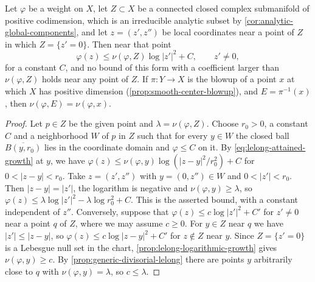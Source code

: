 \begin{proposition}\label{prop:generic-lelong-uniform-growth}
Let $\varphi$ be a weight on $X$, let $Z\subset X$ be a connected closed complex submanifold of positive codimension, which is an irreducible analytic subset by \cref{cor:analytic-global-components}, and let $z=(z',z'')$ be local coordinates near a point of $Z$ in which $Z=\{z'=0\}$. Then near that point
\[
 \varphi(z)\leq\nu(\varphi,Z)\log|z'|^2+C,\qquad z'\neq0,
\]
for a constant $C$, and no bound of this form with a coefficient larger than $\nu(\varphi,Z)$ holds near any point of $Z$. If $\pi\colon Y\to X$ is the blowup of a point $x$ at which $X$ has positive dimension (\cref{prop:smooth-center-blowup}), and $E=\pi^{-1}(x)$, then $\nu(\varphi,E)=\nu(\varphi,x)$.
\end{proposition}
\begin{proof}
Let $p\in Z$ be the given point and $\lambda=\nu(\varphi,Z)$. Choose $r_0>0$, a constant $C$ and a neighborhood $W$ of $p$ in $Z$ such that for every $y\in W$ the closed ball $\overline{B(y,r_0)}$ lies in the coordinate domain and $\varphi\leq C$ on it. By \eqref{eq:lelong-attained-growth} at $y$, we have $\varphi(z)\leq\nu(\varphi,y)\log(|z-y|^2/r_0^2)+C$ for $0<|z-y|<r_0$. Take $z=(z',z'')$ with $y=(0,z'')\in W$ and $0<|z'|<r_0$. Then $|z-y|=|z'|$, the logarithm is negative and $\nu(\varphi,y)\geq\lambda$, so $\varphi(z)\leq\lambda\log|z'|^2-\lambda\log r_0^2+C$. This is the asserted bound, with a constant independent of $z''$. Conversely, suppose that $\varphi(z)\leq c\log|z'|^2+C'$ for $z'\neq0$ near a point $q$ of $Z$, where we may assume $c\geq0$. For $y\in Z$ near $q$ we have $|z'|\leq|z-y|$, so $\varphi(z)\leq c\log|z-y|^2+C'$ for $z\notin Z$ near $y$. Since $Z=\{z'=0\}$ is a Lebesgue null set in the chart, \cref{prop:lelong-logarithmic-growth} gives $\nu(\varphi,y)\geq c$. By \cref{prop:generic-divisorial-lelong} there are points $y$ arbitrarily close to $q$ with $\nu(\varphi,y)=\lambda$, so $c\leq\lambda$.


\end{proof}
